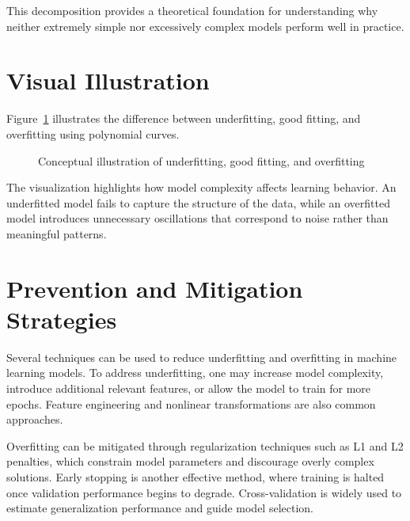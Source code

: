 \documentclass{article}
\begin{document}
This decomposition provides a theoretical foundation for understanding why neither
extremely simple nor excessively complex models perform well in practice.

\section{Visual Illustration}
\label{sec:figure}

Figure~\ref{fig:overunderfit} illustrates the difference between underfitting, good
fitting, and overfitting using polynomial curves.

\begin{figure}[htbp]
\centering
{}
\caption{Conceptual illustration of underfitting, good fitting, and overfitting}
\label{fig:overunderfit}
\end{figure}

The visualization highlights how model complexity affects learning behavior.
An underfitted model fails to capture the structure of the data, while an
overfitted model introduces unnecessary oscillations that correspond to noise
rather than meaningful patterns.

\section{Prevention and Mitigation Strategies}
\label{sec:prevention}

Several techniques can be used to reduce underfitting and overfitting in machine
learning models. To address underfitting, one may increase model complexity,
introduce additional relevant features, or allow the model to train for more
epochs. Feature engineering and nonlinear transformations are also common
approaches.

Overfitting can be mitigated through regularization techniques such as L1 and L2
penalties, which constrain model parameters and discourage overly complex
solutions. Early stopping is another effective method, where training is halted
once validation performance begins to degrade. Cross-validation is widely used to
estimate generalization performance and guide model selection.
\end{document}

